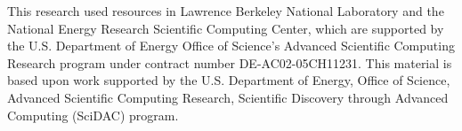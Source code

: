 \documentclass[conference]{IEEEtran}
\begin{document}
This research used resources in Lawrence Berkeley National Laboratory and the National Energy Research Scientific Computing Center, which are supported by the U.S. Department of Energy Office of Science's Advanced Scientific Computing Research program under contract number DE-AC02-05CH11231.  
This material is based upon work supported by the U.S. Department of Energy, Office of Science, Advanced Scientific Computing Research, Scientific Discovery through Advanced Computing (SciDAC) program.








\end{document}

